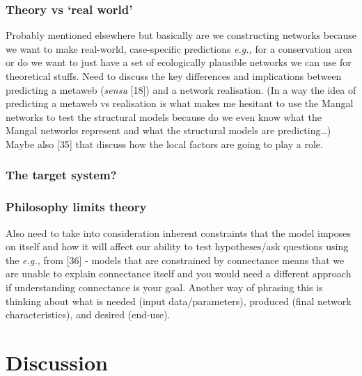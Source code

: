\documentclass[
]{article}
\begin{document}
\subsubsection{Theory vs `real world'}\label{theory-vs-real-world}

Probably mentioned elsewhere but basically are we constructing networks
because we want to make real-world, case-specific predictions
\emph{e.g.,} for a conservation area or do we want to just have a set of
ecologically plausible networks we can use for theoretical stuffs. Need
to discuss the key differences and implications between predicting a
metaweb (\emph{sensu} {[}18{]}) and a network realisation. (In a way the
idea of predicting a metaweb vs realisation is what makes me hesitant to
use the Mangal networks to test the structural models because do we even
know what the Mangal networks represent and what the structural models
are predicting\ldots) Maybe also {[}35{]} that discuss how the local
factors are going to play a role.

\subsubsection{The target system?}\label{the-target-system}

\subsubsection{Philosophy limits theory}\label{philosophy-limits-theory}

Also need to take into consideration inherent constraints that the model
imposes on itself and how it will affect our ability to test
hypotheses/ask questions using the \emph{e.g.,} from {[}36{]} - models
that are constrained by connectance means that we are unable to explain
connectance itself and you would need a different approach if
understanding connectance is your goal. Another way of phrasing this is
thinking about what is needed (input data/parameters), produced (final
network characteristics), and desired (end-use).

\section{Discussion}\label{discussion}
\end{document}
